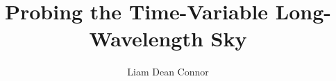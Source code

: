 \documentclass[12pt]{ut-thesis}
\author{Liam Dean Connor}
\title{Probing the Time-Variable Long-Wavelength Sky}
\begin{document}
\begin{preliminary}

\maketitle




\end{preliminary}
\end{document}
